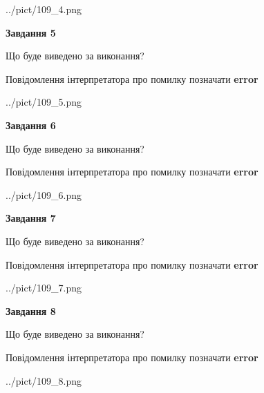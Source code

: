 \documentclass[12pt, ukrainian]{article}
\begin{document}
{\begin{center}
	{../pict/109_4.png}
\end{center}
\newpage

{\begin {center}\textbf{Завдання 5}\end {center}}\par
Що буде виведено за виконання? \par
Повідомлення інтерпретатора про помилку позначати \textbf{error}

\begin{center}
	{../pict/109_5.png}
\end{center}
\newpage

{\begin {center}\textbf{Завдання 6}\end {center}}\par
Що буде виведено за виконання? \par
Повідомлення інтерпретатора про помилку позначати \textbf{error}

\begin{center}
	{../pict/109_6.png}
\end{center}
\newpage

{\begin {center}\textbf{Завдання 7}\end {center}}\par
Що буде виведено за виконання? \par
Повідомлення інтерпретатора про помилку позначати \textbf{error}

\begin{center}
	{../pict/109_7.png}
\end{center}
\newpage

{\begin {center}\textbf{Завдання 8}\end {center}}\par
Що буде виведено за виконання? \par
Повідомлення інтерпретатора про помилку позначати \textbf{error}

\begin{center}
	{../pict/109_8.png}
\end{center}
\newpage

}
\end{document}
